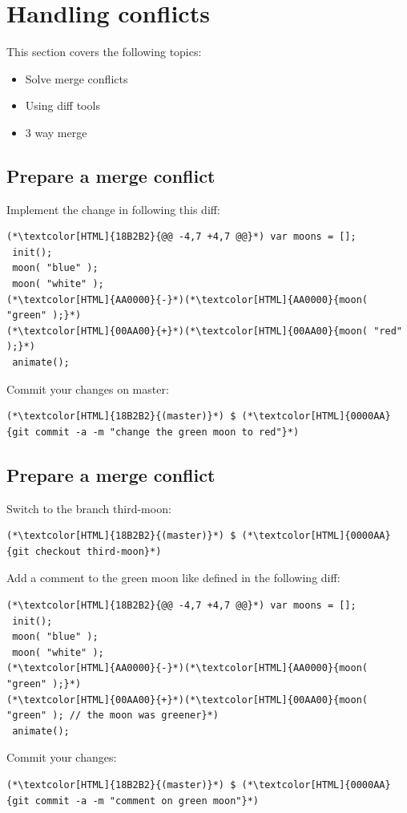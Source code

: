 \section{Handling conflicts}
\begin{frame}[fragile]
  \slidetitle
  This section covers the following topics:
  \begin{itemize}
    \item Solve merge conflicts
    \item Using diff tools
    \item 3 way merge
  \end{itemize}
\end{frame}

\subsection{Prepare a merge conflict}
\begin{frame}[fragile]
  \subslidetitle
  Implement the change in  following this diff:
  \begin{lstlisting}
(*\textcolor[HTML]{18B2B2}{@@ -4,7 +4,7 @@}*) var moons = [];
 init();
 moon( "blue" );
 moon( "white" );
(*\textcolor[HTML]{AA0000}{-}*)(*\textcolor[HTML]{AA0000}{moon( "green" );}*)
(*\textcolor[HTML]{00AA00}{+}*)(*\textcolor[HTML]{00AA00}{moon( "red" );}*)
 animate();
\end{lstlisting}

  Commit your changes on master:
  \begin{lstlisting}
(*\textcolor[HTML]{18B2B2}{(master)}*) $ (*\textcolor[HTML]{0000AA}{git commit -a -m "change the green moon to red"}*)
\end{lstlisting}

\end{frame}

\subsection{Prepare a merge conflict}
\begin{frame}[fragile]
  \subslidetitle

  Switch to the branch third-moon:
  \begin{lstlisting}
(*\textcolor[HTML]{18B2B2}{(master)}*) $ (*\textcolor[HTML]{0000AA}{git checkout third-moon}*)
\end{lstlisting}

  Add a comment to the green moon like defined in the following diff:
  \begin{lstlisting}
(*\textcolor[HTML]{18B2B2}{@@ -4,7 +4,7 @@}*) var moons = [];
 init();
 moon( "blue" );
 moon( "white" );
(*\textcolor[HTML]{AA0000}{-}*)(*\textcolor[HTML]{AA0000}{moon( "green" );}*)
(*\textcolor[HTML]{00AA00}{+}*)(*\textcolor[HTML]{00AA00}{moon( "green" ); // the moon was greener}*)
 animate();
\end{lstlisting}

  Commit your changes:
  \begin{lstlisting}
(*\textcolor[HTML]{18B2B2}{(master)}*) $ (*\textcolor[HTML]{0000AA}{git commit -a -m "comment on green moon"}*)
\end{lstlisting}
\end{frame}

